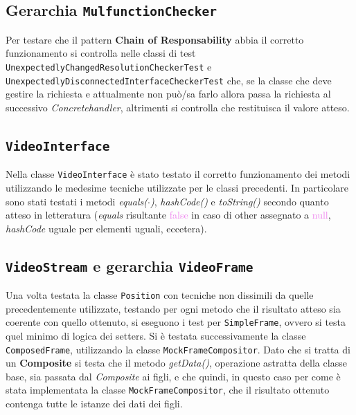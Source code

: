 \documentclass[a4paper,11pt]{article}
\begin{document}
	\subsection{Gerarchia \texttt{MulfunctionChecker}}
	Per testare che il pattern \textbf{Chain of Responsability} abbia il corretto funzionamento si controlla nelle classi di test \texttt{UnexpectedlyChangedResolutionCheckerTest} e \texttt{UnexpectedlyDisconnectedInterfaceCheckerTest} che, se la classe che deve gestire la richiesta e attualmente non può/sa farlo allora passa la richiesta al successivo \textit{Concretehandler}, altrimenti si controlla che restituisca il valore atteso.
	
	
	\subsection{\texttt{VideoInterface}}
	Nella classe \texttt{VideoInterface} è stato testato il corretto funzionamento dei metodi utilizzando le medesime tecniche utilizzate per le classi precedenti. In particolare sono stati testati i metodi \textit{equals($\cdot$)}, \textit{hashCode()} e \textit{toString()} secondo quanto atteso in letteratura (\textit{equals} risultante \textcolor{violet}{false} in caso di other assegnato a \textcolor{violet}{null}, \textit{hashCode} uguale per elementi uguali, eccetera).
	
	
	\subsection{\texttt{VideoStream} e gerarchia \texttt{VideoFrame}}
	Una volta testata la classe \texttt{Position} con tecniche non dissimili da quelle precedentemente utilizzate, testando per ogni metodo che il risultato atteso sia coerente con quello ottenuto, si eseguono i test per \texttt{SimpleFrame}, ovvero si testa quel minimo di logica dei setters.
	Si è testata successivamente la classe \texttt{ComposedFrame}, utilizzando la classe \texttt{MockFrameCompositor}. Dato che si tratta di un \textbf{Composite} si testa che il metodo \textit{getData()}, operazione astratta della classe base, sia passata dal \textit{Composite} ai figli, e che quindi, in questo caso per come è stata implementata la classe \texttt{MockFrameCompositor}, che il risultato ottenuto contenga tutte le istanze dei dati dei figli.
	
	
\end{document}
